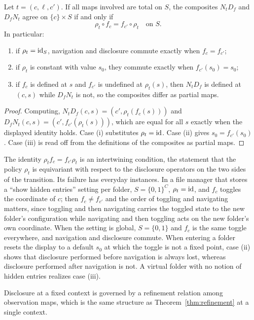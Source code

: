 \begin{proposition}\label{prop:commute}
Let $t=(c,\ell,c')$. If all maps involved are total on $S$, the composites $N_tD_f$ and $D_fN_t$ agree on $\{c\}\times S$ if and only if
\[
\rho_t\circ f_c=f_{c'}\circ\rho_t\quad\text{on }S.
\]
In particular:
\begin{enumerate}[label=(\roman*)]
\item if $\rho_t=\mathrm{id}_S$, navigation and disclosure commute exactly when $f_c=f_{c'}$;
\item if $\rho_t$ is constant with value $s_0$, they commute exactly when $f_{c'}(s_0)=s_0$;
\item if $f_c$ is defined at $s$ and $f_{c'}$ is undefined at $\rho_t(s)$, then $N_tD_f$ is defined at $(c,s)$ while $D_fN_t$ is not, so the composites differ as partial maps.
\end{enumerate}
\end{proposition}
\begin{proof}
Computing, $N_tD_f(c,s)=(c',\rho_t(f_c(s)))$ and $D_fN_t(c,s)=(c',f_{c'}(\rho_t(s)))$, which are equal for all $s$ exactly when the displayed identity holds. Case (i) substitutes $\rho_t=\mathrm{id}$. Case (ii) gives $s_0=f_{c'}(s_0)$. Case (iii) is read off from the definitions of the composites as partial maps.
\end{proof}

The identity $\rho_t f_c=f_{c'}\rho_t$ is an intertwining condition, the statement that the policy $\rho_t$ is equivariant with respect to the disclosure operators on the two sides of the transition. Its failure has everyday instances. In a file manager that stores a ``show hidden entries'' setting per folder, $S=\{0,1\}^C$, $\rho_t=\mathrm{id}$, and $f_c$ toggles the coordinate of $c$; then $f_c\neq f_{c'}$ and the order of toggling and navigating matters, since toggling and then navigating carries the toggled state to the new folder's configuration while navigating and then toggling acts on the new folder's own coordinate. When the setting is global, $S=\{0,1\}$ and $f_c$ is the same toggle everywhere, and navigation and disclosure commute. When entering a folder resets the display to a default $s_0$ at which the toggle is not a fixed point, case (ii) shows that disclosure performed before navigation is always lost, whereas disclosure performed after navigation is not. A virtual folder with no notion of hidden entries realizes case (iii).

Disclosure at a fixed context is governed by a refinement relation among observation maps, which is the same structure as Theorem~\ref{thm:refinement} at a single context.

